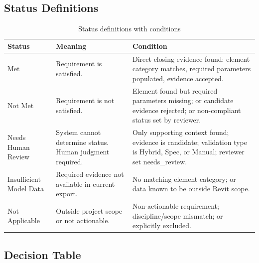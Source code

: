 \documentclass[10pt,letterpaper]{article}
\begin{document}
\subsection{Status Definitions}

\begin{longtable}{p{1.0in}p{2.2in}p{3.5in}}
\caption{Status definitions with conditions}
\label{tab:status-defs}\\
\toprule
\textbf{Status} & \textbf{Meaning} & \textbf{Condition} \\
\midrule
\endhead
Met & Requirement is satisfied. & Direct closing evidence found: element category matches,
  required parameters populated, evidence accepted. \\
Not Met & Requirement is not satisfied. & Element found but required parameters missing;
  or candidate evidence rejected; or non-compliant status set by reviewer. \\
Needs Human Review & System cannot determine status. Human judgment required.
  & Only supporting context found; evidence is candidate; validation type is
  Hybrid, Spec, or Manual; reviewer set needs\_review. \\
Insufficient Model Data & Required evidence not available in current export. & No matching element
  category; or data known to be outside Revit scope. \\
Not Applicable & Outside project scope or not actionable. & Non-actionable requirement;
  discipline/scope mismatch; or explicitly excluded. \\
\bottomrule
\end{longtable}

\subsection{Decision Table}
\end{document}
